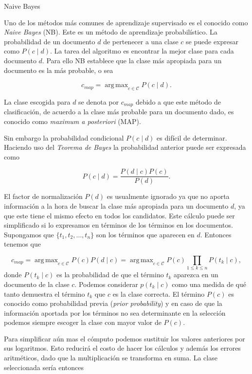 \documentclass{llncs}
\DeclareMathOperator*{\argmax}{arg\,max}
\begin{document}
	\begin{subsection}{Naive Bayes}

		Uno de los m\'etodos m\'as comunes de aprendizaje supervisado es el conocido como \emph{Naive Bayes} (NB). Este es un m\'etodo de aprendizaje probabil\'istico. La probabilidad de un documento $d$ de pertenecer a una clase $c$ se puede expresar como $P(c\mid d)$. La tarea del algoritmo es encontrar la mejor clase para cada documento $d$. Para ello NB establece que la clase m\'as apropiada para un documento es la m\'as probable, o sea
		
		\[
		c_{map} = \argmax_{c\in\mathcal{C}} P(c \mid d).
		\]
		
		La clase escogida para $d$ se denota por $c_{map}$ debido a que este m\'etodo de clasificaci\'on, de acuerdo a la clase m\'as probable para un documento dado, es conocido como \emph{maximum a posteriori} (MAP).
		
		Sin embargo la probabilidad condicional $P(c \mid d)$ es dif\'icil de determinar. Haciendo uso del \emph{Teorema de Bayes} la probabilidad anterior puede ser expresada como
		
		\[
		P(c \mid d) =\frac{ P(d\mid c) P(c)}{P(d)}.
		\]
		
		El factor de normalizaci\'on $P(d)$ es usualmente ignorado ya que no aporta informaci\'on a la hora de buscar la clase m\'as apropiada para un documento $d$, ya que este tiene el mismo efecto en todos los candidatos. Este c\'alculo puede ser simplificado si lo expresamos en t\'erminos de los t\'erminos en los documentos. Supongamos que $\{t_1, t_2, \dots , t_n \}$ son los t\'erminos que aparecen en $d$. Entonces tenemos que  
		
		\[
			c_{map} = \argmax_{c\in\mathcal{C}} P(c) P(d \mid c) = \argmax_{c\in\mathcal{C}} P(c) \prod_{1\leq k\leq n} P(t_k \mid c),
		\]
		donde $P(t_k \mid c)$ es la probabilidad de que el t\'ermino $t_k$ aparezca en un documento de la clase $c$. Podemos considerar $p(t_k \mid c)$ como una medida de qu\'e tanto demuestra el t\'ermino $t_k$ que $c$ es la clase correcta. El t\'ermino $P(c)$ es conocido como probabilidad previa (\emph{prior probability}) y en caso de que la informaci\'on aportada por los t\'erminos no sea determinante en la selecci\'on podemos siempre escoger la clase con mayor valor de $P(c)$.
		
		Para simplificar a\'un mas el c\'omputo podemos sustituir los valores anteriores por sus logaritmos. Esto reducir\'a el costo de hacer los c\'alculos y adem\'as los errores aritm\'eticos, dado que la multiplicaci\'on se transforma en suma. La clase seleccionada ser\'ia entonces
		

\end{subsection}
\end{document}
